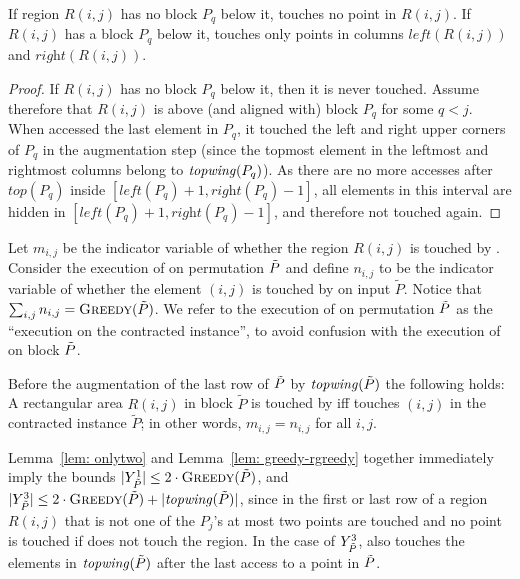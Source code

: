 
\begin{lemma}
\label{lem: onlytwo}
If region $R(i,j)$ has no block $P_q$ below it, \agreedy touches no point in $R(i,j)$. 
If $R(i,j)$ has a block $P_q$ below it, \agreedy touches only points in columns $\textit{left}(R(i,j))$ and $\textit{right}(R(i,j))$.
\end{lemma}

\begin{proof}
If $R(i,j)$ has no block $P_q$ below it, then it is never touched. Assume therefore that $R(i,j)$ is above (and aligned with) block $P_q$ for some $q<j$. When \agreedy accessed the last element in $P_q$, it touched the left and right upper corners of $P_q$ in the augmentation step (since the topmost element in the leftmost and rightmost columns belong to $\mathit{topwing}(P_q)$). As there are no more accesses after $\textit{top}(P_q)$ inside $[\textit{left}(P_q)+1, \textit{right}(P_q)-1]$, all elements in this interval are hidden in $[\textit{left}(P_q)+1, \textit{right}(P_q)-1]$, and therefore not touched again.
\end{proof}

Let $m_{i,j}$ be the indicator variable of whether the region $R(i,j)$ is touched by \agreedy. 
Consider the execution of \greedy on permutation $\tilde{P}$ and define $n_{i,j}$ to be the indicator variable of whether the element $(i,j)$ is touched by \greedy on input $\tilde{P}$. Notice that $\sum_{i,j} n_{i,j} =  \textsc{Greedy}(\tilde{P})$. We refer to the execution of \greedy on permutation $\tilde{P}$ as the ``execution on the contracted instance'', to avoid confusion with the execution of \agreedy on block $\tilde{P}$.

\begin{lemma}
\label{lem: greedy-rgreedy} Before the augmentation of the last row of $\tilde{P}$ by $\mathit{topwing}(\tilde{P})$ the following holds:
A rectangular area $R(i,j)$ in block $\tilde{P}$ is touched by \agreedy iff \greedy touches $(i,j)$ in the contracted instance $\tilde{P}$; in other words, $m_{i,j} = n_{i,j}$ for all $i,j$. 
\end{lemma}

Lemma~\ref{lem: onlytwo} and Lemma~\ref{lem: greedy-rgreedy} together immediately imply the bounds $|Y_{\tilde{P}}^1| \le 2 \cdot \textsc{Greedy}(\tilde{P})$, and $|Y_{\tilde{P}}^3| \le 2 \cdot \textsc{Greedy}(\tilde{P}) + |\mathit{topwing}(\tilde{P})|$, since in the first or last row of a region $R(i,j)$ that is not one of the $P_j$'s at most two points are touched and no point is touched if \greedy does not touch the region. In the case of $Y_{\tilde{P}}^3$, \agreedy also touches the elements in $\mathit{topwing}(\tilde{P})$ after the last access to a point in $\tilde{P}$. 

